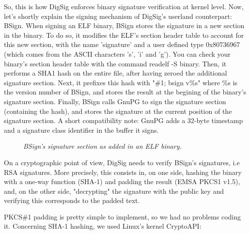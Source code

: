 \documentclass{article}
\begin{document}
So, this is how DigSig enforces binary signature verification at
kernel level. Now, let's shortly explain the signing mechanism of
DigSig's userland counterpart: BSign. When signing an ELF binary,
BSign stores the signature in a new section in the binary.  To do so,
it modifies the ELF's section header table to account for this new
section, with the name 'signature' and a user defined type 0x80736967
(which comes from the ASCII characters 's', 'i' and 'g'). You can
check your binary's section header table with the command readelf -S
binary.  Then, it performs a SHA1 hash on the entire file, after
having zeroed the additional signature section.  Next, it prefixes
this hash with "\#1; bsign v\%s" where \%s is the version number of
BSign, and stores the result at the begining of the binary's signature
section. Finally, BSign calls GnuPG to sign the signature section
(containing the hash), and stores the signature at the current position
of the signature section. A short compatibility note: GnuPG adds a
32-byte timestamp and a signature class identifier in the
buffer it signs.

\begin{figure}[h]
\begin{center}
\epsfxsize=10cm 
\caption{{\it BSign's signature section as added in an ELF binary. }}
\label{fig2}
\end{center}
\end{figure}


On a cryptographic point of view, DigSig needs to verify 
BSign's signatures, i.e RSA signatures. More precisely, this 
consists in, on one side, hashing the binary
with a one-way function (SHA-1) and padding the result (EMSA PKCS1 v1.5), and,
on the other side, "decrypting" the signature with the public key
and verifying this corresponds to the padded text.

PKCS\#1 padding is pretty simple to implement, so we had no problems
coding it. Concerning SHA-1 hashing, we used Linux's kernel CryptoAPI:
\end{document}
